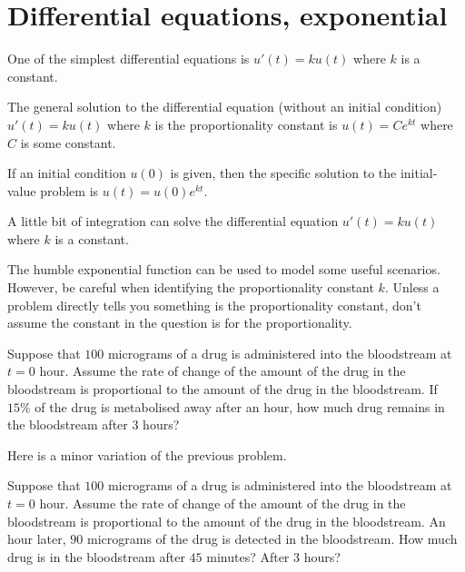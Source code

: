 \documentclass[../main.tex]{subfiles}
\begin{document}
 \section{Differential equations, exponential}

One of the simplest differential equations  is \(u'(t) = ku(t)\) where \(k\) is a constant.

\begin{method} \label{method:de-exponential}
  The general solution to the differential equation (without an initial condition) \(u'(t) = k u(t)\)  where \(k\) is the proportionality constant is \(u(t) = C e^{kt}\) where \(C\) is some constant.

  If an initial condition \(u(0)\) is given, then the specific solution to the initial-value problem is \(u(t) = u(0) e^{kt}\).
\end{method}

A little bit of integration can solve the differential equation \(u'(t) = ku(t)\) where \(k\) is a constant.

\blanks*
\clearpage

The humble exponential function can be used to model some useful scenarios. However, be careful when identifying the proportionality constant \(k\). Unless a problem directly tells you something is the proportionality constant, don't assume the constant in the question is for the proportionality.

\begin{example} \label{eg:exponential-metabolism}
  Suppose that \(100\) micrograms of a drug is administered into the bloodstream at \(t = 0\) hour.  Assume the rate of change of the amount of the drug in the bloodstream is proportional to the amount of the drug in the bloodstream.  If \(15\%\) of the drug is metabolised away after an hour, how much drug remains in the bloodstream  after \(3\) hours?

  \blanks*
\end{example}
\clearpage

Here is a minor variation of the previous problem.
\begin{exercise} \label{ex:exponential-metabolism-v2}
  Suppose that \(100\) micrograms of a drug is administered into the bloodstream at \(t = 0\) hour.  Assume the rate of change of the amount of the drug in the bloodstream is proportional to the amount of the drug in the bloodstream.  An hour later, \(90\) micrograms of the drug is detected in the bloodstream. How much drug is in the bloodstream after \(45\) minutes? After \(3\) hours?

  \blanks*
\end{exercise}
\clearpage
\end{document}
